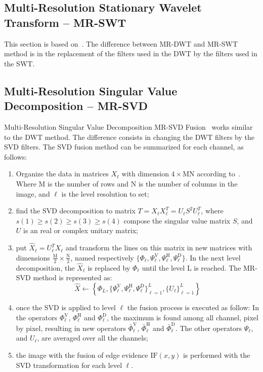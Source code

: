 \documentclass[journal]{IEEEtran}
\begin{document}
\subsection{Multi-Resolution Stationary Wavelet Transform -- MR-SWT}  
This section is based on~\cite{n_r, jjly}. The difference between MR-DWT and MR-SWT method is in the replacement of the filters used in the DWT by the filters used in the SWT.

\subsection{Multi-Resolution Singular Value Decomposition -- MR-SVD}

Multi-Resolution Singular Value Decomposition MR-SVD Fusion~\cite{naidu} works similar to the DWT method. The difference consists in changing the DWT filters by the SVD filters. The SVD fusion method can be summarized for each channel, as follows:
\begin{enumerate}
\item Organize the data in matrices $X_\ell$ with dimension $4\times\text{MN}$ according to~\cite{naidu}. Where M is the number of rows and N is the number of columns in the image, and $\ell$ is the level resolution to set;  
\item find the SVD decomposition to matrix $T=X_\ell X_\ell^T=U_\ell S^2 U_\ell^T$, where $s(1)\geq s(2) \geq s(3) \geq s(4)$ compose the singular value matrix $S$, and $U$ is an real or complex unitary matrix;
\item put $\widehat{X}_\ell=U_\ell^TX_\ell$ and transform the lines on this matrix in new matrices with dimensions $\frac{\text{M}}{2}\times\frac{\text{N}}{2}$, named respectively $\{\Phi_\ell, \Psi_\ell^\text{V}, \Psi_\ell^\text{H}, \Psi_\ell^\text{D}\}$. In the next level decomposition, the $\widehat{X}_\ell$ is replaced by $\Phi_\ell$ until the level L is reached. The MR-SVD method is represented as:
\begin{equation}\label{msvd_iter}
\widehat{X}\leftarrow \left\{\Phi_L,\{\Psi_\ell^\text{V},\Psi_\ell^\text{H},\Psi_\ell^\text{D} \}_{\ell=1}^L,\{U_\ell\}_{\ell=1}^L \right\}
\end{equation}
\item once the SVD is applied to level $\ell$ the fusion process is executed as follow: In the operators $\Phi_\ell^\text{V}$, $\Phi_\ell^\text{H}$ and $\Phi_\ell^\text{D}$, the maximum is found among all channel, pixel by pixel, resulting in new operators $\bar{\Phi}_\ell^\text{V}$, $\bar{\Phi}_\ell^\text{H}$ and $\bar{\Phi}_\ell^\text{D}$. The other operators $\Psi_\ell$, and $U_\ell$, are averaged over all the channels;
\item the image with the fusion of edge evidence $\text{IF}(x,y)$ is performed with the SVD transformation for each level $\ell$. 
\end{enumerate}
\end{document}

